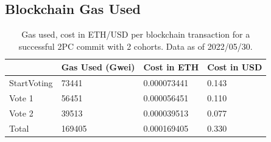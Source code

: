 \documentclass[11pt,sigplan,screen,nonacm]{acmart}
\begin{document}

\begin{appendices}

  \section{Blockchain Gas Used}
  \label{appendix:blockchaingas}

  \begin{table}[hbtp]
    \centering
    \caption{Gas used, cost in ETH/USD per blockchain transaction for a successful 2PC commit with 2 cohorts. Data as of 2022/05/30.}
    \label{table:cost}
    \begin{tabular}{|p{1.8cm}|p{1.8cm}|p{2cm}|p{1.8cm}|}
      \hline
          & Gas Used (Gwei) &  Cost in ETH & Cost in USD \\
          \hline
      StartVoting &73441 &0.000073441 & 0.143\\
      \hline
      Vote 1 &56451	&0.000056451 &0.110\\
      \hline
      Vote 2 &39513 &0.000039513 &0.077\\
      \hline
      Total &169405 &0.000169405 &0.330\\
      \hline
    \end{tabular}
  \end{table}

\end{appendices}
\end{document}
